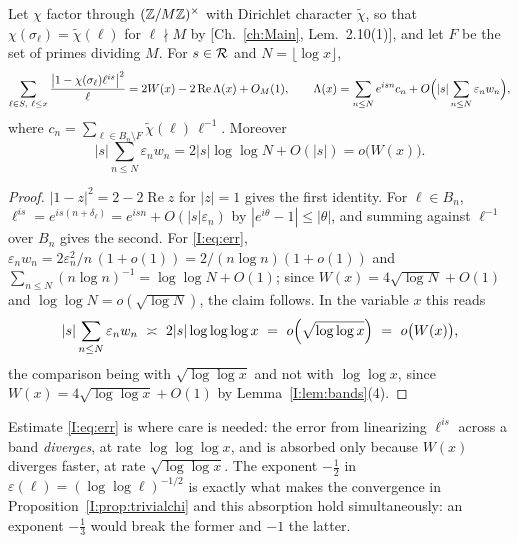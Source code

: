 \begin{lemma}[Linearization]\label{I:lem:lin}
Let $\chi$ factor through $(\mathbb{Z}/M\mathbb{Z})^\times$ with Dirichlet character $\tilde\chi$, so that
$\chi(\sigma_\ell)=\tilde\chi(\ell)$ for $\ell\nmid M$ by [Ch.~\ref{ch:Main}, Lem.~2.10(1)], and let
$F$ be the set of primes dividing $M$. For $s\in\mathcal{R}$ and $N=\lfloor\log x\rfloor$,
\begin{equation}\label{I:eq:linear}
\sum_{\ell\in S,\ \ell\le x}\frac{\bigl|1-\chi(\sigma_\ell)\ell^{is}\bigr|^2}{\ell}
=2W(x)-2\operatorname{Re}\Lambda(x)+O_M(1),
\qquad
\Lambda(x)=\sum_{n\le N}e^{isn}c_n+O\Bigl(|s|\sum_{n\le N}\varepsilon_nw_n\Bigr),
\end{equation}
where $c_n=\sum_{\ell\in B_n\setminus F}\tilde\chi(\ell)\,\ell^{-1}$. Moreover
\begin{equation}\label{I:eq:err}
|s|\sum_{n\le N}\varepsilon_nw_n=2|s|\log\log N+O(|s|)=o\bigl(W(x)\bigr).
\end{equation}
\end{lemma}

\begin{proof}
$|1-z|^2=2-2\operatorname{Re}z$ for $|z|=1$ gives the first identity. For $\ell\in B_n$,
$\ell^{is}=e^{is(n+\delta_\ell)}=e^{isn}+O(|s|\varepsilon_n)$ by $|e^{i\theta}-1|\le|\theta|$,
and summing against $\ell^{-1}$ over $B_n$ gives the second. For \eqref{I:eq:err},
$\varepsilon_nw_n=2\varepsilon_n^2/n\,(1+o(1))=2/(n\log n)(1+o(1))$ and
$\sum_{n\le N}(n\log n)^{-1}=\log\log N+O(1)$; since $W(x)=4\sqrt{\log N}+O(1)$ and
$\log\log N=o(\sqrt{\log N})$, the claim follows. In the variable $x$ this reads
\begin{equation}\label{I:eq:absorb}
|s|\sum_{n\le N}\varepsilon_nw_n\ \asymp\ 2|s|\log\log\log x
\ =\ o\Bigl(\sqrt{\log\log x}\Bigr)\ =\ o\bigl(W(x)\bigr),
\end{equation}
the comparison being with $\sqrt{\log\log x}$ and not with $\log\log x$, since
$W(x)=4\sqrt{\log\log x}+O(1)$ by Lemma~\ref{I:lem:bands}(4).
\end{proof}

\begin{remark}\label{I:rem:delicate}
Estimate \eqref{I:eq:err} is where care is needed: the error from linearizing $\ell^{is}$
across a band \emph{diverges}, at rate $\log\log\log x$, and is absorbed only because $W(x)$
diverges faster, at rate $\sqrt{\log\log x}$. The exponent $-\tfrac12$ in
$\varepsilon(\ell)=(\log\log\ell)^{-1/2}$ is exactly what makes the convergence in
Proposition~\ref{I:prop:trivialchi} and this absorption hold simultaneously: an exponent
$-\tfrac13$ would break the former and $-1$ the latter.
\end{remark}

